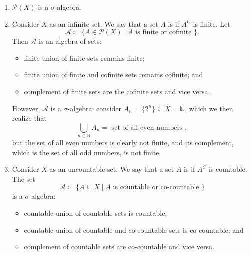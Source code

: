 \documentclass[notoc,notitlepage]{tufte-book}
\begin{document}
\begin{eg}\label{eg:examples_of_sigma_algebra}
  \begin{enumerate}
    \item $\mathcal{P}(X)$ is a $\sigma$-algebra.
    \item Consider $X$ as an infinite set.
      We say that a set $A$ is  if $A^C$ is finite.
      Let
      \begin{equation*}
        \mathcal{A} \coloneqq \{ A \in \mathcal{P}(X)
          \mid A \text{ is finite or cofinite } \}.
      \end{equation*}
      Then $\mathcal{A}$ is an algebra of sets:
      \begin{itemize}
        \item finite union of finite sets remains finite;
        \item finite union of finite and cofinite sets remains cofinite; and
        \item complement of finite sets are the cofinite sets and vice versa.
      \end{itemize}
      However, $\mathcal{A}$ is  a $\sigma$-algebra:
      consider $A_n = \{ 2^n \} \subseteq X = \mathbb{N}$,
      which we then realize that
      \begin{equation*}
        \bigcup_{n \in \mathbb{N}} A_n = \text{ set of all even numbers },
      \end{equation*}
      but the set of all even numbers is clearly not finite, and
      its complement, which is the set of all odd numbers, is not finite.
    \item Consider $X$ as an uncountable set.
      We say that a set $A$ is  if $A^C$ is countable.
      The set
      \begin{equation*}
        \mathcal{A} \coloneqq \{ A \subseteq X
          \mid A \text{ is countable or co-countable } \}
      \end{equation*}
      is a $\sigma$-algebra:
      \begin{itemize}
        \item countable union of countable sets is countable;
        \item countable union of countable
          and co-countable sets is co-countable; and
        \item complement of countable sets are co-countable and vice versa.
      \end{itemize}
  \end{enumerate}
\end{eg}
\end{document}
